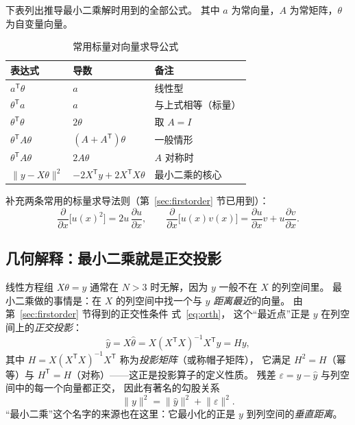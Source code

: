 \documentclass[cn,blue,11pt,device=normal]{elegantnote}
\newcommand{\fref}[1]{式~\eqref{#1}}
\begin{document}
下表列出推导最小二乘解时用到的全部公式。
其中 $a$ 为常向量，$A$ 为常矩阵，$\theta$ 为自变量向量。

\begin{table}[htbp]
  \centering
  \small
  \caption{常用标量对向量求导公式}
  \label{tab:matrixderiv}
  \begin{tabular}{@{}lll@{}}
    \toprule
    表达式 & 导数 & 备注 \\
    \midrule
    $a^{\mathsf T}\theta$                & $a$                        & 线性型 \\
    $\theta^{\mathsf T}a$                & $a$                        & 与上式相等（标量） \\
    $\theta^{\mathsf T}\theta$           & $2\theta$                  & 取 $A=I$ \\
    $\theta^{\mathsf T}A\theta$          & $(A+A^{\mathsf T})\theta$  & 一般情形 \\
    $\theta^{\mathsf T}A\theta$          & $2A\theta$                 & $A$ 对称时 \\
    $\lVert y-X\theta\rVert^{2}$         & $-2X^{\mathsf T}y + 2X^{\mathsf T}X\theta$ & 最小二乘的核心 \\
    \bottomrule
  \end{tabular}
\end{table}

补充两条常用的标量求导法则（第~\ref{sec:firstorder} 节已用到）：
\begin{equation}
  \frac{\partial}{\partial x}\bigl[u(x)^2\bigr] = 2u\,\frac{\partial u}{\partial x},
  \qquad
  \frac{\partial}{\partial x}\bigl[u(x)v(x)\bigr]
  = \frac{\partial u}{\partial x}v + u\frac{\partial v}{\partial x}.
\end{equation}

\subsection{几何解释：最小二乘就是正交投影}

线性方程组 $X\theta = y$ 通常在 $N>3$ 时无解，因为 $y$ 一般不在 $X$ 的列空间里。
最小二乘做的事情是：在 $X$ 的列空间中找一个与 $y$ \emph{距离最近}的向量。
由第~\ref{sec:firstorder} 节得到的正交性条件 \fref{eq:orth}，
这个“最近点”正是 $y$ 在列空间上的\emph{正交投影}：
\begin{equation}
  \hat y = X\hat\theta = X(X^{\mathsf T}X)^{-1}X^{\mathsf T}y = Hy ,
\end{equation}
其中 $H = X(X^{\mathsf T}X)^{-1}X^{\mathsf T}$ 称为\emph{投影矩阵}（或称帽子矩阵），
它满足 $H^2=H$（幂等）与 $H^{\mathsf T}=H$（对称）——这正是投影算子的定义性质。
残差 $\varepsilon = y-\hat y$ 与列空间中的每一个向量都正交，
因此有著名的勾股关系
\begin{equation}
  \lVert y\rVert^{2} = \lVert \hat y\rVert^{2} + \lVert\varepsilon\rVert^{2}.
\end{equation}
“最小二乘”这个名字的来源也在这里：它最小化的正是 $y$ 到列空间的\emph{垂直距离}。
\end{document}
